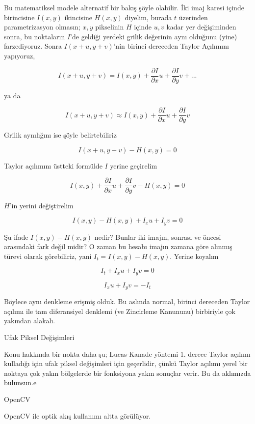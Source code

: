 \documentclass[12pt,fleqn]{article}\usepackage{../../common}
\begin{document}
Bu matematiksel modele alternatif bir bakış şöyle olabilir. İki imaj karesi
içinde birincisine $I(x,y)$ ikincisine $H(x,y)$ diyelim, burada $t$
üzerinden parametrizasyon olmasın; $x,y$ pikselinin $H$ içinde $u,v$ kadar
yer değişiminden sonra, bu noktaların $I$'de geldiği yerdeki grilik değerinin
aynı olduğunu (yine) farzediyoruz. Sonra $I(x+u,y+v)$'nin birinci
dereceden Taylor Açılımını yapıyoruz, 

$$ I(x+u,y+v) = I(x,y) + \frac{\partial I}{\partial x}u + 
\frac{\partial I}{\partial y}v + ...
$$

ya da

$$ I(x+u,y+v) \approx I(x,y) + \frac{\partial I}{\partial x}u + 
\frac{\partial I}{\partial y}v 
$$

Grilik aynılığını ise şöyle belirtebiliriz

$$  I(x+u,y+v) - H(x,y) = 0$$

Taylor açılımını üstteki formülde $I$ yerine geçirelim

$$ I(x,y) + 
\frac{\partial I}{\partial x}u + 
\frac{\partial I}{\partial y}v - H(x,y) = 0
$$

$H$'in yerini değiştirelim

$$ I(x,y)  - H(x,y) + I_xu + I_yv = 0$$

Şu ifade $I(x,y) - H(x,y)$ nedir? Bunlar iki imajın, sonrası ve öncesi
arasındaki fark değil midir?  O zaman bu hesabı imajın zamana göre alınmış
türevi olarak görebiliriz, yani $I_t = I(x,y) - H(x,y)$. Yerine koyalım

$$ I_t + I_xu + I_yv = 0$$

$$ I_xu + I_yv = -I_t $$

Böylece aynı denkleme erişmiş olduk. Bu aslında normal, birinci
dereceden Taylor açılımı ile tam diferansiyel denklemi (ve Zincirleme
Kanununu) birbiriyle çok yakından alakalı.

Ufak Piksel Değişimleri

Konu hakkında bir nokta daha şu; Lucas-Kanade yöntemi 1. derece Taylor
açılımı kulladığı için ufak piksel değişimleri için geçerlidir, çünkü
Taylor açılımı yerel bir noktaya çok yakın bölgelerde bir fonksiyona
yakın sonuçlar verir. Bu da aklımızda bulunsun.e

OpenCV

OpenCV ile optik akış kullanımı altta görülüyor. 
\end{document}
